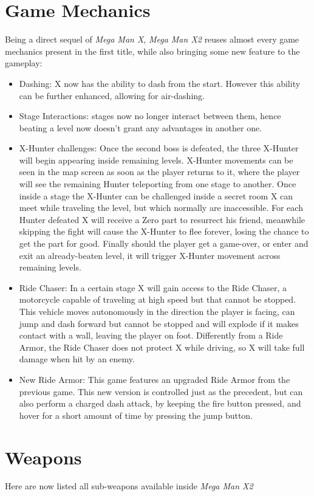 \section{Game Mechanics}
Being a direct sequel of \textit{Mega Man X}, \textit{Mega Man X2} reuses almost every game mechanics present in the first title, while also bringing some new feature to the gameplay:
\begin{itemize}
	\item Dashing: X now has the ability to dash from the start. However this ability can be further enhanced, allowing for air-dashing.
	\item Stage Interactions: stages now no longer interact between them, hence beating a level now doesn't grant any advantages in another one.
	\item X-Hunter challenges: Once the second boss is defeated, the three X-Hunter will begin appearing inside remaining levels. X-Hunter movements can be seen in the map screen as soon as the player returns to it, where the player will see the remaining Hunter teleporting from one stage to another. Once inside a stage the X-Hunter can be challenged inside a secret room X can meet while traveling the level, but which normally are inaccessible. For each Hunter defeated X will receive a Zero part to resurrect his friend, meanwhile skipping the fight will cause the X-Hunter to flee forever, losing the chance to get the part for good. Finally should the player get a game-over, or enter and exit an already-beaten level, it will trigger X-Hunter movement across remaining levels.
	\item Ride Chaser: In a certain stage X will gain access to the Ride Chaser, a motorcycle capable of traveling at high speed but that cannot be stopped. This vehicle moves autonomously in the direction the player is facing, can jump and dash forward but cannot be stopped and will explode if it makes contact with a wall, leaving the player on foot. Differently from a Ride Armor, the Ride Chaser does not protect X while driving, so X will take full damage when hit by an enemy.
	\item New Ride Armor: This game features an upgraded Ride Armor from the previous game. This new version is controlled just as the precedent, but can also perform a charged dash attack, by keeping the fire button pressed, and hover for a short amount of time by pressing the jump button.
\end{itemize}

\section{Weapons}\label{X2:sub_weapon}
Here are now listed all sub-weapons available inside \textit{Mega Man X2}~\cite{wiki:X_weapons}

